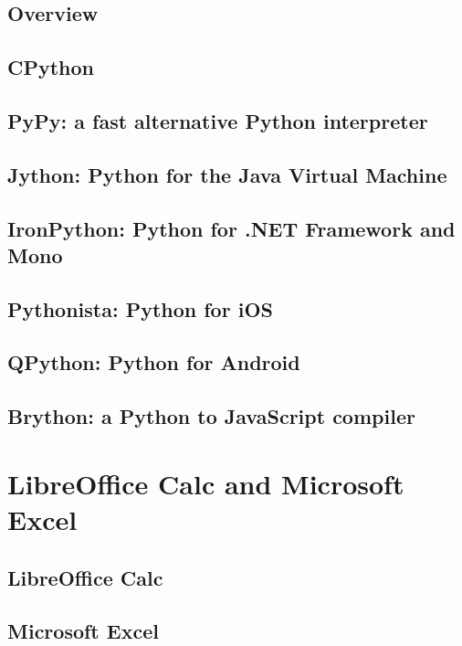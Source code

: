 \documentclass[12pt,a4paper,openany]{book}
\begin{document}
\section{Overview}

\section{CPython}

\section{PyPy: a fast alternative Python interpreter}

\section{Jython: Python for the Java Virtual Machine}

\section{IronPython: Python for .NET Framework and Mono}

\section{Pythonista: Python for iOS}

\section{QPython: Python for Android}

\section{Brython: a Python to JavaScript compiler}

\chapter{LibreOffice Calc and Microsoft Excel}

\section{LibreOffice Calc}

\section{Microsoft Excel}
\end{document}
